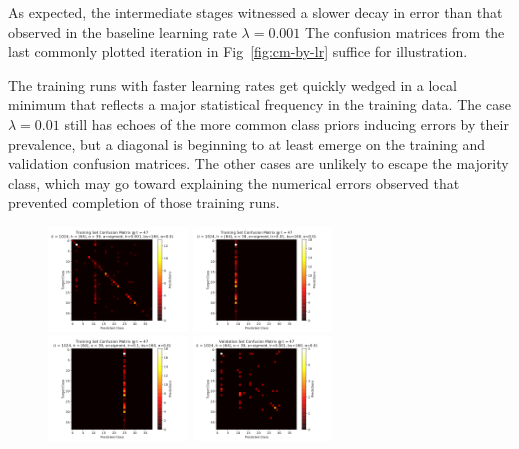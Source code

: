 \documentclass[10pt,epsf]{article}
\begin{document}
{{{      As expected, the intermediate stages witnessed
      a slower decay in error than that observed in the baseline learning rate $\lambda = 0.001$
      The confusion matrices from the last commonly plotted iteration in Fig~\ref{fig:cm-by-lr}
      suffice for illustration.

      The training runs with faster learning rates get quickly wedged in a local minimum that
      reflects a major statistical frequency in the training data. The case $\lambda = 0.01$
      still has echoes of the more common class priors inducing errors by their prevalence,
      but a diagonal is beginning to at least emerge on the training and validation confusion
      matrices. The other cases are unlikely to escape the majority class, which may go toward
      explaining the numerical errors observed that prevented completion of those training runs.
    }
    \begin{figure}[H]
      \includegraphics[width=0.33\textwidth]{./img/64-0.001-160-0-sigmoid-1/confusion-matrix-training-47.png}
      \includegraphics[width=0.33\textwidth]{./img/64-0.01-160-0-sigmoid-1/confusion-matrix-training-47.png}
      \includegraphics[width=0.33\textwidth]{./img/64-0.1-160-0-sigmoid-1/confusion-matrix-training-47.png}
      \includegraphics[width=0.33\textwidth]{./img/64-0.001-160-0-sigmoid-1/confusion-matrix-validation-47.png}

\end{figure}}}
\end{document}
